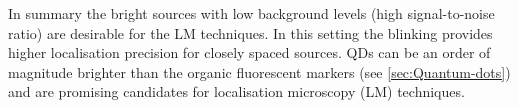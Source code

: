 In summary the bright sources with low background levels (high signal-to-noise ratio) are desirable for the LM techniques. In this setting the blinking provides higher localisation precision for closely spaced sources. QDs can be an order of magnitude brighter than the organic fluorescent markers (see \autoref{sec:Quantum-dots}) and are promising candidates for localisation microscopy (LM) techniques. 



%
%



